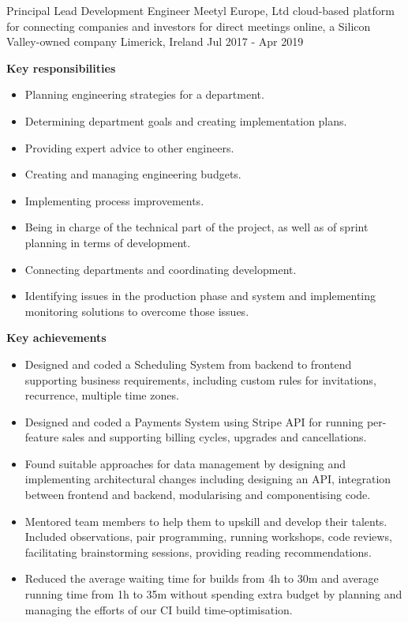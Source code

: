\begin{cventries}
    \cventry
    {Principal Lead Development Engineer} %
    {Meetyl Europe, Ltd \textnormal{cloud-based platform for connecting companies and investors for direct meetings online, a Silicon Valley-owned company}} %
    {Limerick, Ireland} %
    {Jul 2017 - Apr 2019} %
    {
        \textbf{Key responsibilities}
        \begin{itemize}
            \item {Planning engineering strategies for a department.}
            \item {Determining department goals and creating implementation plans.}
            \item {Providing expert advice to other engineers.}
            \item {Creating and managing engineering budgets.}
            \item {Implementing process improvements.}
            \item {Being in charge of the technical part of the project, as well as of sprint planning in terms of development.}
            \item {Connecting departments and coordinating development.}
            \item {Identifying issues in the production phase and system and implementing monitoring solutions to overcome those issues.}
        \end{itemize}
        \textbf{Key achievements}
        \begin{itemize}
            \item {Designed and coded a Scheduling System from backend to frontend supporting business requirements, including custom rules for invitations, recurrence, multiple time zones.}
            \item {Designed and coded a Payments System using Stripe API for running per-feature sales and supporting billing cycles, upgrades and cancellations.}
            \item {Found suitable approaches for data management by designing and implementing architectural changes including designing an API, integration between frontend and backend, modularising and componentising code.}
            \item {Mentored team members to help them to upskill and develop their talents. Included observations, pair programming, running workshops, code reviews, facilitating brainstorming sessions, providing reading recommendations.}
            \item {Reduced the average waiting time for builds from 4h to 30m and average running time from 1h to 35m without spending extra budget by planning and managing the efforts of our CI build time-optimisation.}

\end{itemize}}
\end{cventries}
